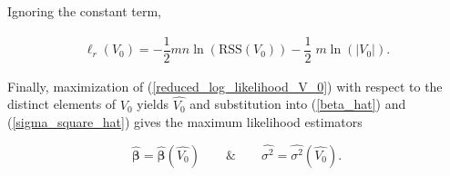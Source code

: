 \documentclass[11pt, a4paper]{article}
\begin{document}
Ignoring the constant term,

\begin{align}\label{reduced_log_likelihood_V_0}
\ell_r(V_0) = -\dfrac{1}{2} mn \ln \left( \text{RSS}(V_0) \right) - \dfrac{1}{2} \; m \ln(\left| V_0 \right|).
\end{align}

Finally, maximization of (\ref{reduced_log_likelihood_V_0}) with respect to the distinct elements of $V_0$ yields $\widehat{V_0}$ and substitution into (\ref{beta_hat}) and (\ref{sigma_square_hat}) gives the maximum likelihood estimators

$$\widehat{\boldsymbol{\beta}} = \widehat{\boldsymbol{\beta}}(\widehat{V_0}) \qquad \& \qquad \widehat{{\sigma^2}} = \widehat{{\sigma^2}}(\widehat{V_0}).$$
\end{document}
